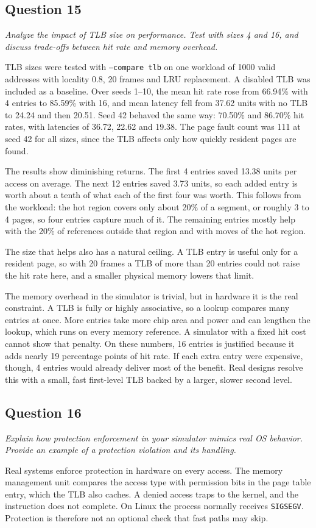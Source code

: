 \documentclass[11pt]{article}
\newcommand{\question}[2]{\subsection*{Question #1}\noindent\textit{#2}\par\medskip}
\newcommand{\code}[1]{\texttt{#1}}
\begin{document}
\question{15}{Analyze the impact of TLB size on performance. Test with sizes 4 and 16, and discuss trade-offs between hit rate and memory overhead.}
TLB sizes were tested with \code{--compare tlb} on one workload of 1000 valid
addresses with locality 0.8, 20 frames and LRU replacement. A disabled TLB was
included as a baseline. Over seeds 1--10, the mean hit rate rose from 66.94\% with
4 entries to 85.59\% with 16, and mean latency fell from 37.62 units with no TLB to
24.24 and then 20.51. Seed 42 behaved the same way: 70.50\% and 86.70\% hit rates,
with latencies of 36.72, 22.62 and 19.38. The page fault count was 111 at seed 42
for all sizes, since the TLB affects only how quickly resident pages are found.

The results show diminishing returns. The first 4 entries saved 13.38 units per
access on average. The next 12 entries saved 3.73 units, so each added entry is
worth about a tenth of what each of the first four was worth. This follows from
the workload: the hot region covers only about 20\% of a segment, or roughly 3 to 4
pages, so four entries capture much of it. The remaining entries mostly help with
the 20\% of references outside that region and with moves of the hot region.

The size that helps also has a natural ceiling. A TLB entry is useful only for a
resident page, so with 20 frames a TLB of more than 20 entries could not raise the
hit rate here, and a smaller physical memory lowers that limit.

The memory overhead in the simulator is trivial, but in hardware it is the real
constraint. A TLB is fully or highly associative, so a lookup compares many entries
at once. More entries take more chip area and power and can lengthen the lookup,
which runs on every memory reference. A simulator with a fixed hit cost cannot show
that penalty. On these numbers, 16 entries is justified because it adds nearly 19
percentage points of hit rate. If each extra entry were expensive, though, 4
entries would already deliver most of the benefit. Real designs resolve this with
a small, fast first-level TLB backed by a larger, slower second level.

\question{16}{Explain how protection enforcement in your simulator mimics real OS behavior. Provide an example of a protection violation and its handling.}
Real systems enforce protection in hardware on every access. The memory management
unit compares the access type with permission bits in the page table entry, which
the TLB also caches. A denied access traps to the kernel, and the instruction does
not complete. On Linux the process normally receives \code{SIGSEGV}. Protection is
therefore not an optional check that fast paths may skip.
\end{document}
